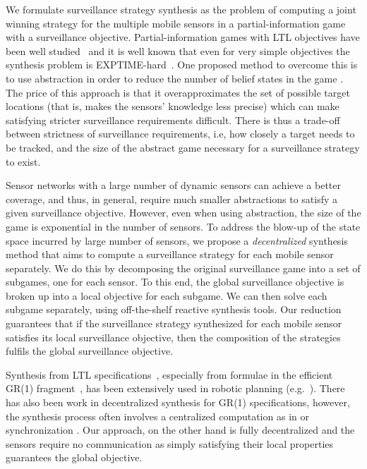 We formulate surveillance strategy synthesis as the problem of computing a joint winning strategy for the multiple mobile sensors in a partial-information game with a surveillance objective. Partial-information games with LTL objectives have been well studied~\cite{DoyenR11,Chatterjee2013} and it is well known that even for very simple objectives the synthesis problem is EXPTIME-hard~\cite{Reif84,BerwangerD08}. One proposed method to overcome this is to use abstraction in order to reduce the number of belief states in the game \cite{arxiv}. The price of this approach is that it overapproximates the set of possible target locations (that is, makes the sensors' knowledge less precise) which can make satisfying stricter surveillance requirements difficult. There is thus a trade-off between strictness of surveillance requirements, i.e, how closely a target needs to be tracked, and the size of the abstract game necessary for a surveillance strategy to exist. 

Sensor networks with a large number of dynamic sensors can achieve a better coverage, and thus, in general, require much smaller abstractions to satisfy a given surveillance objective. However, even when using abstraction, the size of the game is exponential in the number of sensors. To address the blow-up of the state space incurred by large number of sensors, we propose a \emph{decentralized} synthesis method that aims to compute a surveillance strategy for each mobile sensor separately. We do this by decomposing the original surveillance game into a set of subgames, one for each sensor. To this end, the global surveillance objective is  broken up into a local objective for each subgame. We can then solve each subgame separately, using off-the-shelf reactive synthesis tools. Our reduction guarantees  that if the surveillance strategy synthesized for each mobile sensor satisfies its local surveillance objective, then the composition of the strategies fulfils the global surveillance objective.

Synthesis from LTL specifications~\cite{Pnueli1989}, especially from formulae in the efficient GR(1) fragment~\cite{Piterman2006}, has been extensively used in robotic planning (e.g.~\cite{wong2012,Kress2007}). There has also been work in decentralized synthesis for GR(1) specifications, however, the synthesis process often involves a centralized computation as in \cite{Kloetzer06} or synchronization \cite{Salar17,Kloetzer11}. Our approach, on the other hand is fully  decentralized and the sensors require no communication as simply satisfying their local properties guarantees the global objective.

